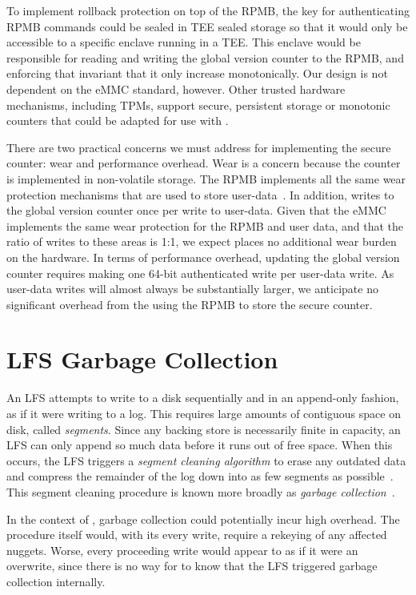 To implement rollback protection on top of the RPMB, the key for authenticating RPMB
commands could be sealed in TEE sealed storage so that it would only be accessible to a
specific enclave running in a TEE. This enclave would be responsible for reading and
writing the \SYSTEM{} global version counter to the RPMB, and enforcing that invariant
that it only increase monotonically. Our design is not dependent on the eMMC standard,
however. Other trusted hardware mechanisms, including TPMs, support secure, persistent
storage or monotonic counters that could be adapted for use with \SYSTEM{}.

There are two practical concerns we must address for implementing the
secure counter: wear and performance overhead.  Wear is a concern because the
counter is implemented in non-volatile storage.  The RPMB implements
all the same wear protection mechanisms that are used to store
user-data~\cite{eMMC-standard}.  In addition, \SYSTEM{} writes to the
global version counter once per write to user-data.  Given that the
eMMC implements the same wear protection for the RPMB and user data,
and that the ratio of writes to these areas is 1:1, we expect
\SYSTEM{} places no additional wear burden on the hardware.  In terms
of performance overhead, updating the global version counter requires
making one 64-bit authenticated write per user-data write.  As
user-data writes will almost always be substantially larger, we
anticipate no significant overhead from the using the RPMB to store
the secure counter.

\section{LFS Garbage Collection}

An LFS attempts to write to a disk sequentially and in an append-only fashion,
as if it were writing to a log. This requires large amounts of contiguous space
on disk, called \emph{segments}. Since any backing store is necessarily finite
in capacity, an LFS can only append so much data before it runs out of free
space. When this occurs, the LFS triggers a \emph{segment cleaning algorithm} to
erase any outdated data and compress the remainder of the log down into as few
segments as possible~\cite{LFS,F2FS}. This segment cleaning procedure is known
more broadly as \emph{garbage collection}~\cite{F2FS}.

In the context of \SYSTEM{}, garbage collection could potentially
incur high overhead. The procedure itself would, with its every write,
require a rekeying of any affected nuggets. Worse, every proceeding
write would appear to \SYSTEM{} as if it were an overwrite, since
there is no way for \SYSTEM{} to know that the LFS triggered garbage
collection internally.


